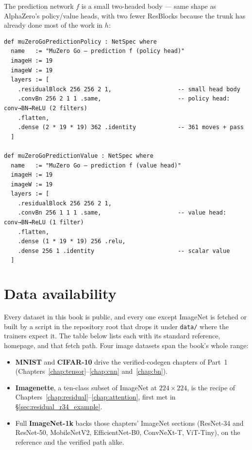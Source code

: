 The prediction network $f$ is a small two-headed body --- same shape
as AlphaZero's policy/value heads, with two fewer ResBlocks because
the trunk has already done most of the work in $h$:

\begin{verbatim}
def muZeroGoPredictionPolicy : NetSpec where
  name   := "MuZero Go — prediction f (policy head)"
  imageH := 19
  imageW := 19
  layers := [
    .residualBlock 256 256 2 1,                   -- small head body
    .convBn 256 2 1 1 .same,                      -- policy head: conv→BN→ReLU (2 filters)
    .flatten,
    .dense (2 * 19 * 19) 362 .identity            -- 361 moves + pass
  ]

def muZeroGoPredictionValue : NetSpec where
  name   := "MuZero Go — prediction f (value head)"
  imageH := 19
  imageW := 19
  layers := [
    .residualBlock 256 256 2 1,
    .convBn 256 1 1 1 .same,                      -- value head: conv→BN→ReLU (1 filter)
    .flatten,
    .dense (1 * 19 * 19) 256 .relu,
    .dense 256 1 .identity                        -- scalar value
  ]
\end{verbatim}

\hypersetup{bookmarksdepth=1}
\appendix

\chapter{Data availability}
\label{app:data}

Every dataset in this book is public, and every one except ImageNet is
fetched or built by a script in the repository root that drops it under
\texttt{data/} where the trainers expect it. The table below lists each
with its standard reference, homepage, and that fetch path. Four image
datasets span the book's whole range:

\begin{itemize}
  \item \textbf{MNIST} and \textbf{CIFAR-10} drive the verified-codegen
    chapters of Part~1 (Chapters~\ref{chap:tensor}--\ref{chap:cnn}
    and~\ref{chap:bn}).
  \item \textbf{Imagenette}, a ten-class subset of ImageNet at
    $224\times224$, is the recipe of Chapters~\ref{chap:residual}--\ref{chap:attention},
    first met in \S\ref{sec:residual_r34_example}.
  \item Full \textbf{ImageNet-1k} backs those chapters' ImageNet sections
    (ResNet-34 and ResNet-50, MobileNetV2, EfficientNet-B0, ConvNeXt-T,
    ViT-Tiny), on the reference and the verified path alike.
\end{itemize}

